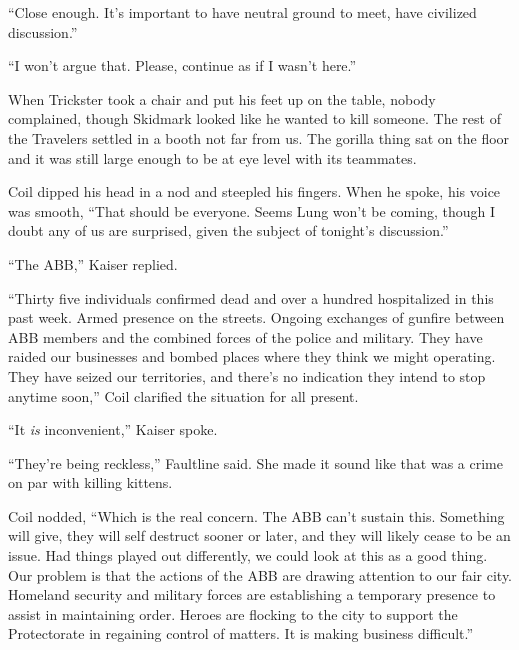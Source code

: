 ``Close enough.  It's important to have neutral ground to meet, have civilized discussion.''



``I won't argue that.  Please, continue as if I wasn't here.''



When Trickster took a chair and put his feet up on the table, nobody complained, though Skidmark looked like he wanted to kill someone.  The rest of the Travelers settled in a booth not far from us.  The gorilla thing sat on the floor and it was still large enough to be at eye level with its teammates.



Coil dipped his head in a nod and steepled his fingers.  When he spoke, his voice was smooth, ``That should be everyone.  Seems Lung won't be coming, though I doubt any of us are surprised, given the subject of tonight's discussion.''



``The ABB,'' Kaiser replied.



``Thirty five individuals confirmed dead and over a hundred hospitalized in this past week.  Armed presence on the streets.  Ongoing exchanges of gunfire between ABB members and the combined forces of the police and military.  They have raided our businesses and bombed places where they think we might operating.  They have seized our territories, and there's no indication they intend to stop anytime soon,'' Coil clarified the situation for all present.



``It \emph{is} inconvenient,'' Kaiser spoke.



``They're being reckless,'' Faultline said.  She made it sound like that was a crime on par with killing kittens.



Coil nodded, ``Which is the real concern.  The ABB can't sustain this.  Something will give, they will self destruct sooner or later, and they will likely cease to be an issue.  Had things played out differently, we could look at this as a good thing.  Our problem is that the actions of the ABB are drawing attention to our fair city.  Homeland security and military forces are establishing a temporary presence to assist in maintaining order.  Heroes are flocking to the city to support the Protectorate in regaining control of matters.  It is making business difficult.''



